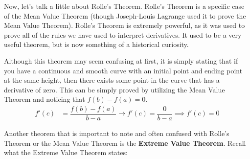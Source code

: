 Now, let's talk a little about Rolle's Theorem. Rolle's Theorem is a specific case of the Mean Value Theorem (though Joseph-Louis Lagrange used it to prove the Mean Value Theorem). Rolle's Theorem is extremely powerful, as it was used to prove all of the rules we have used to interpret derivatives. It used to be a very useful theorem, but is now something of a historical curiosity. \par

\begin{center}
\end{center}

Although this theorem may seem confusing at first, it is simply stating that if you have a continuous and smooth curve with an initial point and ending point at the same height, then there exists some point in the curve that has a derivative of zero. This can be simply proved by utilizing the Mean Value Theorem and noticing that $f(b) - f(a) = 0$. \begin{align*}
    f'(c) &= \dfrac{f(b) - f(a)}{b - a} \rightarrow f'(c) = \dfrac{0}{b - a} \implies f'(c) = 0
\end{align*}

Another theorem that is important to note and often confused with Rolle's Theorem or the Mean Value Theorem is the \textbf{Extreme Value Theorem}. Recall what the Extreme Value Theorem states: \par

